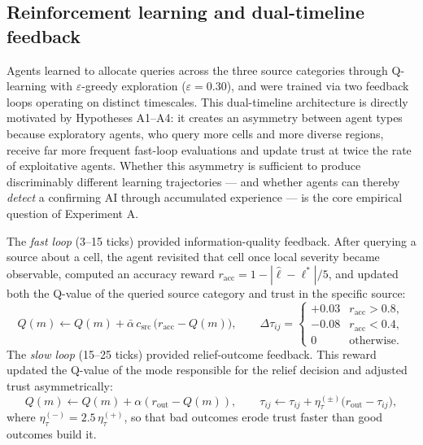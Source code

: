 \documentclass[pdflatex,sn-apa]{sn-jnl}%
\begin{document}
\subsection*{Reinforcement learning and dual-timeline feedback}

Agents learned to allocate queries across the three source categories
through Q-learning with $\varepsilon$-greedy exploration
($\varepsilon=0.30$), and were trained via two feedback loops
operating on distinct timescales.
This dual-timeline architecture is directly motivated by Hypotheses
A1--A4: it creates an asymmetry between agent types because
exploratory agents, who query more cells and more diverse regions,
receive far more frequent fast-loop evaluations and update trust
at twice the rate of exploitative agents.
Whether this asymmetry is sufficient to produce discriminably
different learning trajectories — and whether agents can thereby
\emph{detect} a confirming AI through accumulated experience — is
the core empirical question of Experiment A.

The \emph{fast loop} (3--15 ticks) provided information-quality
feedback.
After querying a source about a cell, the agent revisited that cell
once local severity became observable, computed an accuracy reward
$r_\mathrm{acc} = 1 - |\hat\ell - \ell^*|/5$, and updated both
the Q-value of the queried source category and trust in the specific
source:
%
\begin{equation}
  Q(m) \leftarrow Q(m) + \bar\alpha\,c_\mathrm{src}\,
  \bigl(r_\mathrm{acc} - Q(m)\bigr),
  \qquad
  \Delta\tau_{ij} =
  \begin{cases}
    +0.03 & r_\mathrm{acc} > 0.8,\\
    -0.08 & r_\mathrm{acc} < 0.4,\\
    0     & \text{otherwise.}
  \end{cases}
  \label{eq:fast_update}
\end{equation}
%
The \emph{slow loop} (15--25 ticks) provided relief-outcome
feedback.
This reward updated the Q-value of the mode responsible for the
relief decision and adjusted trust asymmetrically:
%
\begin{equation}
  Q(m) \leftarrow Q(m) + \alpha(r_\mathrm{out} - Q(m)),
  \qquad
  \tau_{ij} \leftarrow \tau_{ij} +
  \eta_\tau^{(\pm)}\bigl(r_\mathrm{out}-\tau_{ij}\bigr),
  \label{eq:slow_update}
\end{equation}
%
where $\eta_\tau^{(-)}=2.5\,\eta_\tau^{(+)}$, so that bad outcomes
erode trust faster than good outcomes build it.
\end{document}
